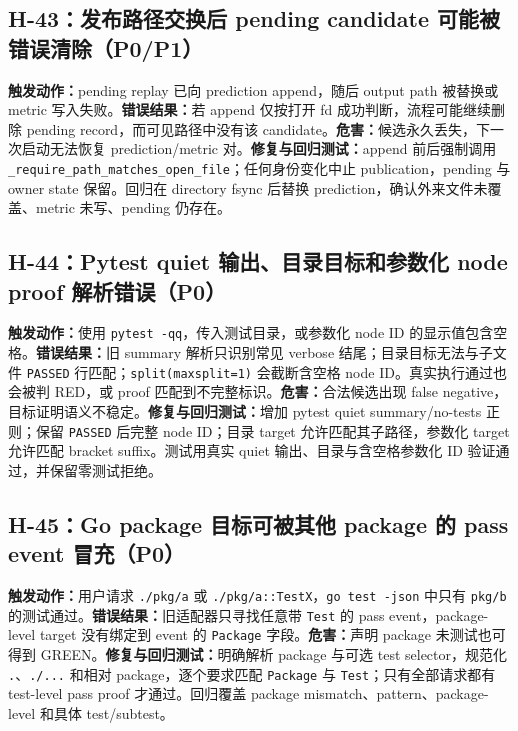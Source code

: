 \documentclass[11pt,a4paper,fontset=fandol]{ctexart}
\newcommand{\code}[1]{\texttt{#1}}
\begin{document}
\subsection{H-43：发布路径交换后 pending candidate 可能被错误清除（P0/P1）}

\textbf{触发动作：}pending replay 已向 prediction append，随后 output path 被替换或 metric 写入失败。\textbf{错误结果：}若 append 仅按打开 fd 成功判断，流程可能继续删除 pending record，而可见路径中没有该 candidate。\textbf{危害：}候选永久丢失，下一次启动无法恢复 prediction/metric 对。\textbf{修复与回归测试：}append 前后强制调用 \code{\_require\_path\_matches\_open\_file}；任何身份变化中止 publication，pending 与 owner state 保留。回归在 directory fsync 后替换 prediction，确认外来文件未覆盖、metric 未写、pending 仍存在。

\subsection{H-44：Pytest quiet 输出、目录目标和参数化 node proof 解析错误（P0）}

\textbf{触发动作：}使用 \code{pytest -qq}，传入测试目录，或参数化 node ID 的显示值包含空格。\textbf{错误结果：}旧 summary 解析只识别常见 verbose 结尾；目录目标无法与子文件 \code{PASSED} 行匹配；\code{split(maxsplit=1)} 会截断含空格 node ID。真实执行通过也会被判 RED，或 proof 匹配到不完整标识。\textbf{危害：}合法候选出现 false negative，目标证明语义不稳定。\textbf{修复与回归测试：}增加 pytest quiet summary/no-tests 正则；保留 \code{PASSED} 后完整 node ID；目录 target 允许匹配其子路径，参数化 target 允许匹配 bracket suffix。测试用真实 quiet 输出、目录与含空格参数化 ID 验证通过，并保留零测试拒绝。

\subsection{H-45：Go package 目标可被其他 package 的 pass event 冒充（P0）}

\textbf{触发动作：}用户请求 \code{./pkg/a} 或 \code{./pkg/a::TestX}，\code{go test -json} 中只有 \code{pkg/b} 的测试通过。\textbf{错误结果：}旧适配器只寻找任意带 \code{Test} 的 pass event，package-level target 没有绑定到 event 的 \code{Package} 字段。\textbf{危害：}声明 package 未测试也可得到 GREEN。\textbf{修复与回归测试：}明确解析 package 与可选 test selector，规范化 \code{.}、\code{./...} 和相对 package，逐个要求匹配 \code{Package} 与 \code{Test}；只有全部请求都有 test-level pass proof 才通过。回归覆盖 package mismatch、pattern、package-level 和具体 test/subtest。
\end{document}
